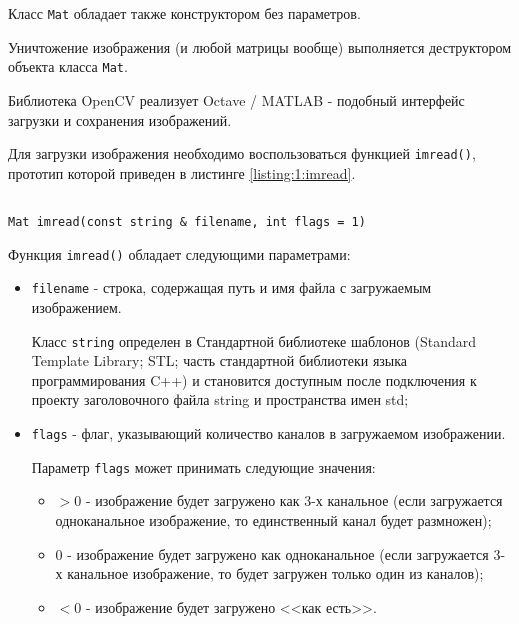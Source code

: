 Класс \verb|Mat| обладает также конструктором без параметров.

Уничтожение изображения (и любой матрицы вообще) выполняется деструктором объекта класса \verb|Mat|.


Библиотека OpenCV реализует Octave / MATLAB - подобный интерфейс загрузки и сохранения изображений.

Для загрузки изображения необходимо воспользоваться функцией \verb|imread()|, прототип которой приведен в листинге \ref{listing:1:imread}.

\begin{lstlisting}

Mat imread(const string & filename, int flags = 1)

\end{lstlisting}
\mylistingend

Функция \verb|imread()| обладает следующими параметрами:

\begin{itemize}

	\item \verb|filename| - строка, содержащая путь и имя файла с загружаемым изображением.

	Класс \verb|string| определен в Стандартной библиотеке шаблонов (Standard Template Library; STL; часть стандартной библиотеки языка программирования C++) и становится доступным после подключения к проекту заголовочного файла string и пространства имен std;

	\item \verb|flags| - флаг, указывающий количество каналов в загружаемом изображении.

	Параметр \verb|flags| может принимать следующие значения:

	\begin{itemize}

		\item $> 0$ - изображение будет загружено как 3-х канальное (если загружается одноканальное изображение, то единственный канал будет размножен);
		\item $0$ - изображение будет загружено как одноканальное (если загружается 3-х канальное изображение, то будет загружен только один из каналов);
		\item $< 0$ - изображение будет загружено <<как есть>>.

	\end{itemize}

\end{itemize}

